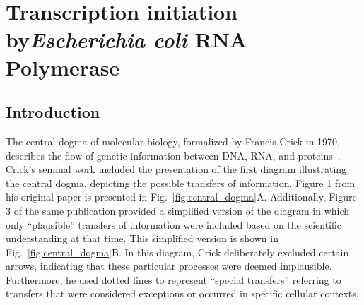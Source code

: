 \chapter{Transcription initiation by\textit{Escherichia coli} RNA Polymerase}
\label{chpt:RNAP}


\section{Introduction}
\label{sec:rnap_intro}

The central dogma of molecular biology, formalized by Francis Crick in 1970, describes the flow of genetic information between DNA, RNA, and proteins~\cite{crick_central}. 
Crick's seminal work included the presentation of the first diagram illustrating the central dogma, depicting the possible transfers of information.
Figure 1 from his original paper is presented in Fig.~\ref{fig:central_dogma}A. 
Additionally, Figure 3 of the same publication provided a simplified version of the diagram in which only \enquote{plausible} transfers of information were included based on the scientific understanding at that time. 
This simplified version is shown in Fig.~\ref{fig:central_dogma}B.
In this diagram, Crick deliberately excluded certain arrows, indicating that these particular processes were deemed implausible. 
Furthermore, he used dotted lines to represent \enquote{special transfers} referring to transfers that were considered exceptions or occurred in specific cellular contexts.

